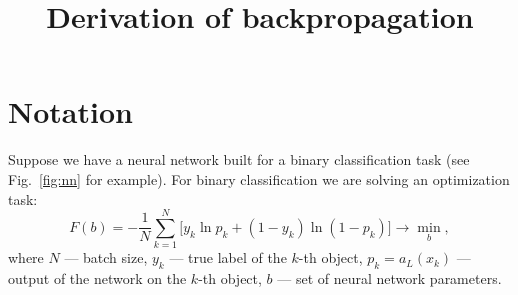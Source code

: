 \documentclass[11pt]{amsart}
\title{Derivation of backpropagation}
\begin{document}
\maketitle

\section{Notation}

Suppose we have a neural network built for a binary classification task (see Fig.~\ref{fig:nn} for example). For binary classification we are solving an optimization task:
$$F(b) = - \dfrac{1}{N} \displaystyle\sum_{k = 1}^N \bigl[ y_k \ln p_k + (1 - y_k) \ln (1 - p_k) \bigr] \rightarrow \min_b,$$
where $N$ --- batch size, $y_k$ --- true label of the $k$-th object, $p_k = a_L(x_k)$ --- output of the network on the $k$-th object, $b$ --- set of neural network parameters.
\end{document}
